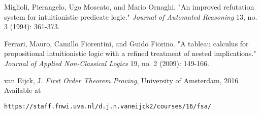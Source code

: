 
\begin{thebibliography}{99}

Miglioli, Pierangelo, Ugo Moscato, and Mario Ornaghi. "An improved refutation system for intuitionistic predicate logic." \emph{Journal of Automated Reasoning} 13, no. 3 (1994): 361-373.

Ferrari, Mauro, Camillo Fiorentini, and Guido Fiorino. "A tableau calculus for propositional intuitionistic logic with a refined treatment of nested implications." \emph{Journal of Applied Non-Classical Logics} 19, no. 2 (2009): 149-166.

 van Eijck, J. \textit{First Order Theorem Proving}, University of Amsterdam, 2016
Available at
\begin{verbatim}
https://staff.fnwi.uva.nl/d.j.n.vaneijck2/courses/16/fsa/
\end{verbatim}

\end{thebibliography}
